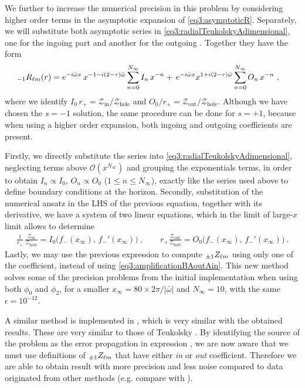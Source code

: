 We further to increase the numerical precision in this problem by considering higher order terms in the asymptotic expansion of \eqref{eq3:asymptoticR}.
Separately, we will substitute both asymptotic series in \eqref{eq3:radialTeukolskyAdimensional}, one for the ingoing part and another for the outgoing \cite{Brito2015}.
Together they have the form
\begin{align}
	\label{eq4:radialIOseries}
	\uu[-1]{R}{\ell m}(r) &= e^{-i \bar{\omega} x}  \, x^{ - 1 - i (2-\tau) \bar{\omega} } \sum_{n=0}^{N_\infty} I_n \, x^{-n} + \, e^{-i \bar{\omega} x} x^{ 1 + i (2-\tau) \bar{\omega} } \sum_{n=0}^{N_\infty} O_n \, x^{-n} ~,
\end{align}
where we identify $I_0 \,r_{+} = \mathscr{Z}_\mathrm{in}/ \mathscr{Z}_\mathrm{hole}$ and $O_0/r_{+} = \mathscr{Z}_\mathrm{out}/\mathscr{Z}_\mathrm{hole}$.
Although we have chosen the $s=-1$ solution, the same procedure can be done for $s=+1$, because when using a higher order expansion, both ingoing and outgoing coefficients are present.

Firstly, we directly substitute the series into \eqref{eq3:radialTeukolskyAdimensional}, neglecting terms above $\mathscr{O}(x^{N_\infty})$ and grouping the exponentials terms, in order to obtain $I_n\propto I_0$, $O_n\propto O_0$ ($1 \le n \le N_\infty$), exactly like the series used above to define boundary conditions at the horizon.
Secondly, substitution of the numerical ansatz  in the LHS of the previous equation, together with its derivative, we have a system of two linear equations, which in the limit of large-$x$ limit allows to determine
\begin{align}
	\frac{1}{r_+} \,\frac{\mathscr{Z}_\mathrm{in}}{\mathscr{Z}_\mathrm{hole}} = I_0\Big( f_{-}(x_\infty), \,f_{-}{\!}'(x_\infty) \Big) ~,\qquad r_{+} \frac{\mathscr{Z}_\mathrm{out}}{\mathscr{Z}_\mathrm{hole}} = O_0\Big( f_{-}(x_\infty), \, f_{-}{\!}'(x_\infty) \Big) ~.
\end{align}
Lastly, we may use the previous expression  to compute $\uu[\pm1]{Z}{\ell m}$ using only one of the coefficient, instead of using \eqref{eq3:amplificationBAoutAin}. 
This new method solves some of the precision problems from the initial implementation when using both $\phi_0$ and $\phi_2$, for a smaller $x_\infty = 80 \times 2 \pi / |\bar{\omega}|$ and $N_\infty = 10$, with the same $\epsilon = 10^{-12}$.

A similar method is implemented in \cite{Brito2015}, which is very similar with the obtained results.
These are very similar to those of Teukolsky \cite{TeukolskyPress1973b}.
By identifying the source of the problem as the error propagation in expression , we are now aware that we must use definitions of $\uu[\pm 1]{Z}{\ell m}$ that have either \emph{in} or \emph{out} coefficient.
Therefore we are able to obtain result with more precision and less noise compared to data originated from other methods (e.g. compare with \cite{Brito2015}).

